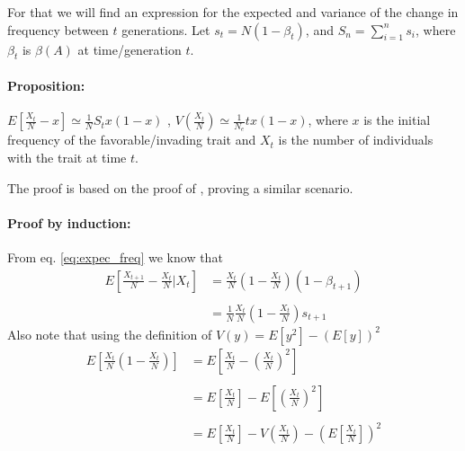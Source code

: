 \documentclass[11pt]{article}
\begin{document}
For that we will find an expression for the expected and variance of the change in frequency between $t$ generations.
Let $s_t=N(1-\beta_t)$, and $S_n=\sum\limits_{i=1}^n s_i$, where $\beta_t$ is $\beta(A)$ at time/generation $t$.


\paragraph{Proposition:} $E[\frac{X_t}{N}-x]\simeq \frac{1}{N}S_tx(1-x)$ , $V(\frac{X_t}{N})\simeq\frac{1}{N_e}tx(1-x)$, where $x$ is the initial frequency of the favorable/invading trait and $X_t$ is the number of individuals with the trait at time $t$.

The proof is based on the proof of \citet{changeEnv}, proving a similar scenario.
\paragraph{Proof by induction:}
From eq. \ref{eq:expec_freq} we know that
\begin{equation}\label{eq:ch_1}
\begin{split}
E\left[\frac{X_{t+1}}{N}-\frac{X_t}{N}\bigg|X_t\right] &= \frac{X_t}{N}\left(1-\frac{X_t}{N}\right)(1-\beta_{t+1}) \\\\
&= \frac{1}{N}\frac{X_t}{N}\left(1-\frac{X_t}{N}\right)s_{t+1}
\end{split}
\end{equation}
Also note that using the definition of $V(y)=E[y^2]-(E[y])^2$
\begin{equation}
\begin{split}
E\left[\frac{X_t}{N}\left(1-\frac{X_t}{N}\right)\right] &= E\left[\frac{X_t}{N}-\left(\frac{X_t}{N}\right)^2\right] \\\\
&= E\left[\frac{X_t}{N}\right]-E\left[\left(\frac{X_t}{N}\right)^2\right] \\\\
&= E\left[\frac{X_t}{N}\right] - V\left(\frac{X_t}{N}\right) - \left(E\left[\frac{X_t}{N}\right]\right)^2
\end{split}
\end{equation}
\end{document}
